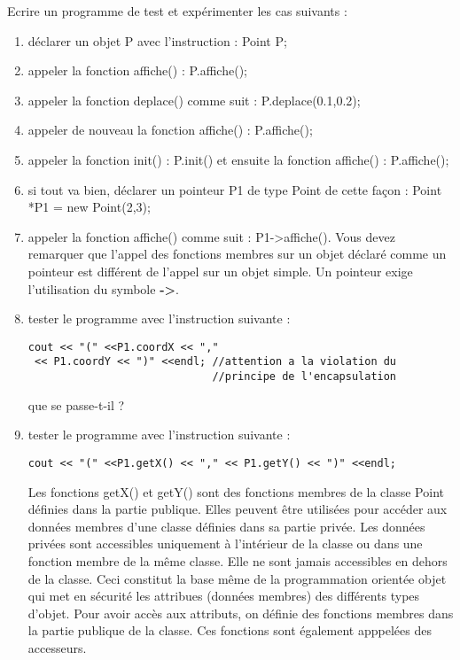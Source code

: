 \documentclass[a4paper, oneside,11pt]{book}
\begin{document}
\begin{enumerate}
Ecrire un programme de test et exp\'erimenter les cas suivants :
\begin{enumerate}
\item d\'eclarer un objet P avec l'instruction : Point P;
\item appeler la fonction affiche() : P.affiche();
\item appeler la fonction deplace() comme suit : P.deplace(0.1,0.2);
\item appeler de nouveau la fonction affiche() : P.affiche();
\item appeler la fonction init() : P.init() et ensuite la fonction affiche() : P.affiche();
\item si tout va bien, d\'eclarer un pointeur P1 de type Point de cette fa\c{c}on : Point *P1 = new Point(2,3);
\item appeler la fonction affiche() comme suit : P1->affiche(). Vous devez remarquer que l'appel des fonctions membres sur un objet d\'eclar\'e comme un pointeur est diff\'erent de 
l'appel sur un objet simple. Un pointeur exige l'utilisation du symbole \textbf{->}.
\item tester le programme avec l'instruction suivante : 
\begin{lstlisting}
cout << "(" <<P1.coordX << ","
 << P1.coordY << ")" <<endl; //attention a la violation du
                             //principe de l'encapsulation
\end{lstlisting}
que se passe-t-il ?
\item tester le programme avec l'instruction suivante :
\begin{lstlisting}
cout << "(" <<P1.getX() << "," << P1.getY() << ")" <<endl;
\end{lstlisting}
Les fonctions getX() et getY() sont des fonctions membres de la classe Point d\'efinies dans la partie publique. Elles peuvent \^etre utilis\'ees pour acc\'eder aux donn\'ees membres
d'une classe d\'efinies dans sa partie priv\'ee. Les donn\'ees priv\'ees sont accessibles uniquement \`a l'int\'erieur de la classe ou dans une fonction membre de la m\^eme classe.
Elle ne sont jamais accessibles en dehors de la classe. Ceci constitut la base m\^eme de la programmation orient\'ee objet qui met en s\'ecurit\'e les attribues (donn\'ees membres) 
des diff\'erents types d'objet. Pour avoir acc\`es aux attributs, on d\'efinie des fonctions membres dans la partie publique de la classe. Ces fonctions sont \'egalement apppel\'ees
des accesseurs.
\end{enumerate}


\end{enumerate}
\end{document}
